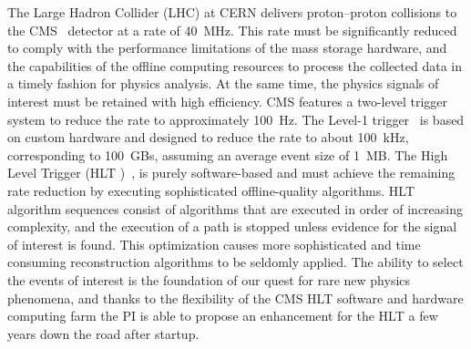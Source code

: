\documentclass{JINST}
\begin{document}
The Large Hadron Collider (LHC) at CERN delivers proton–proton collisions to the CMS~\cite{bib:TP} detector at a rate of 40~MHz. This rate
must be significantly reduced to comply with the performance limitations of the mass storage hardware, and the capabilities
of the offline computing resources to process the collected data in a timely fashion for physics analysis. At the same
time, the physics signals of interest must be retained with high efficiency. CMS features a two-level trigger system to reduce
the rate to approximately 100~Hz. The Level-1 trigger~\cite{bib:TDR1} is based on custom hardware and designed to reduce the rate
to about 100~kHz, corresponding to 100~GBs, assuming an average event size of 1~MB. The High Level Trigger (HLT )~\cite{bib:TDR2},\cite{bib:HLT}
is purely software-based and must achieve the remaining rate reduction by executing sophisticated offline-quality algorithms.
HLT algorithm sequences consist of algorithms that are executed in order of increasing complexity, and
the execution of a path is stopped unless evidence for the signal of interest is found. This optimization causes more sophisticated and time
consuming reconstruction algorithms to be seldomly applied. The ability to select the events of interest is the foundation of our 
quest for rare new physics phenomena, and thanks to the flexibility of the CMS HLT software and hardware computing farm the PI is able 
to propose an enhancement for the HLT a few years down the road after startup.
\end{document}

